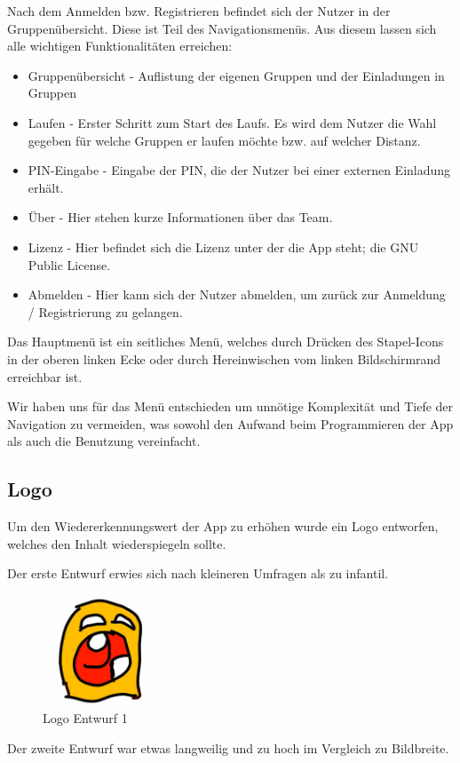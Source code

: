 Nach dem Anmelden bzw. Registrieren befindet sich der Nutzer in der Gruppenübersicht. Diese ist Teil des Navigationsmenüs. Aus diesem lassen sich alle wichtigen Funktionalitäten erreichen:
\begin{itemize}
\item Gruppenübersicht - Auflistung der eigenen Gruppen und der Einladungen in Gruppen
\item Laufen - Erster Schritt zum Start des Laufs. Es wird dem Nutzer die Wahl gegeben für welche Gruppen er laufen möchte bzw. auf welcher Distanz.
\item PIN-Eingabe - Eingabe der PIN, die der Nutzer bei einer externen Einladung erhält.
\item Über - Hier stehen kurze Informationen über das Team.
\item Lizenz - Hier befindet sich die Lizenz unter der die App steht; die GNU Public License. 
\item Abmelden - Hier kann sich der Nutzer abmelden, um zurück zur Anmeldung / Registrierung zu gelangen.
\end{itemize}

Das Hauptmenü ist ein seitliches Menü, welches durch Drücken des Stapel-Icons in der oberen linken Ecke oder durch Hereinwischen vom linken Bildschirmrand erreichbar ist.

Wir haben uns für das Menü entschieden um unnötige Komplexität und Tiefe der Navigation zu vermeiden, was sowohl den Aufwand beim Programmieren der App als auch die Benutzung vereinfacht.

\subsection{Logo}
Um den Wiedererkennungswert der App zu erhöhen wurde ein Logo entworfen, welches den Inhalt wiederspiegeln sollte.

Der erste Entwurf erwies sich nach kleineren Umfragen als zu infantil.

\begin{figure}[!h]
\centering
\includegraphics[width=0.3\textwidth]{abb/icon_entwurf1}
\caption{Logo Entwurf 1}
\end{figure}
Der zweite Entwurf war etwas langweilig und zu hoch im Vergleich zu Bildbreite. 

